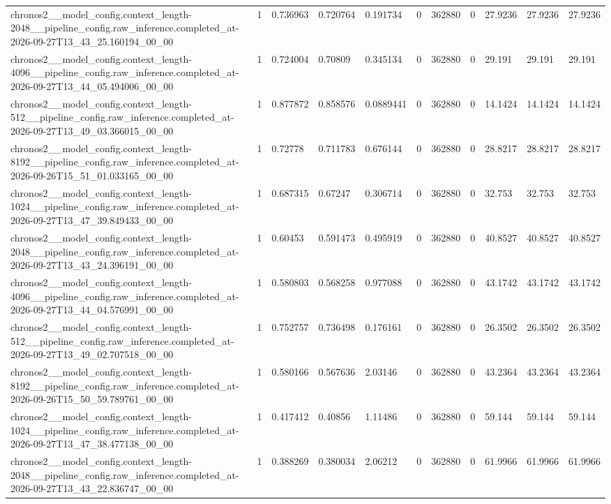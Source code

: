 \begin{tabular}{lllllllllll}
chronos2\_\_model\_config.context\_length-2048\_\_pipeline\_config.raw\_inference.completed\_at-2026-09-27T13\_43\_25.160194\_00\_00 & 1 & 0.736963 & 0.720764 & 0.191734 & 0 & 362880 & 0 & 27.9236 & 27.9236 & 27.9236 \\
chronos2\_\_model\_config.context\_length-4096\_\_pipeline\_config.raw\_inference.completed\_at-2026-09-27T13\_44\_05.494006\_00\_00 & 1 & 0.724004 & 0.70809 & 0.345134 & 0 & 362880 & 0 & 29.191 & 29.191 & 29.191 \\
chronos2\_\_model\_config.context\_length-512\_\_pipeline\_config.raw\_inference.completed\_at-2026-09-27T13\_49\_03.366015\_00\_00 & 1 & 0.877872 & 0.858576 & 0.0889441 & 0 & 362880 & 0 & 14.1424 & 14.1424 & 14.1424 \\
chronos2\_\_model\_config.context\_length-8192\_\_pipeline\_config.raw\_inference.completed\_at-2026-09-26T15\_51\_01.033165\_00\_00 & 1 & 0.72778 & 0.711783 & 0.676144 & 0 & 362880 & 0 & 28.8217 & 28.8217 & 28.8217 \\
chronos2\_\_model\_config.context\_length-1024\_\_pipeline\_config.raw\_inference.completed\_at-2026-09-27T13\_47\_39.849433\_00\_00 & 1 & 0.687315 & 0.67247 & 0.306714 & 0 & 362880 & 0 & 32.753 & 32.753 & 32.753 \\
chronos2\_\_model\_config.context\_length-2048\_\_pipeline\_config.raw\_inference.completed\_at-2026-09-27T13\_43\_24.396191\_00\_00 & 1 & 0.60453 & 0.591473 & 0.495919 & 0 & 362880 & 0 & 40.8527 & 40.8527 & 40.8527 \\
chronos2\_\_model\_config.context\_length-4096\_\_pipeline\_config.raw\_inference.completed\_at-2026-09-27T13\_44\_04.576991\_00\_00 & 1 & 0.580803 & 0.568258 & 0.977088 & 0 & 362880 & 0 & 43.1742 & 43.1742 & 43.1742 \\
chronos2\_\_model\_config.context\_length-512\_\_pipeline\_config.raw\_inference.completed\_at-2026-09-27T13\_49\_02.707518\_00\_00 & 1 & 0.752757 & 0.736498 & 0.176161 & 0 & 362880 & 0 & 26.3502 & 26.3502 & 26.3502 \\
chronos2\_\_model\_config.context\_length-8192\_\_pipeline\_config.raw\_inference.completed\_at-2026-09-26T15\_50\_59.789761\_00\_00 & 1 & 0.580166 & 0.567636 & 2.03146 & 0 & 362880 & 0 & 43.2364 & 43.2364 & 43.2364 \\
chronos2\_\_model\_config.context\_length-1024\_\_pipeline\_config.raw\_inference.completed\_at-2026-09-27T13\_47\_38.477138\_00\_00 & 1 & 0.417412 & 0.40856 & 1.11486 & 0 & 362880 & 0 & 59.144 & 59.144 & 59.144 \\
chronos2\_\_model\_config.context\_length-2048\_\_pipeline\_config.raw\_inference.completed\_at-2026-09-27T13\_43\_22.836747\_00\_00 & 1 & 0.388269 & 0.380034 & 2.06212 & 0 & 362880 & 0 & 61.9966 & 61.9966 & 61.9966 \\

\end{tabular}
